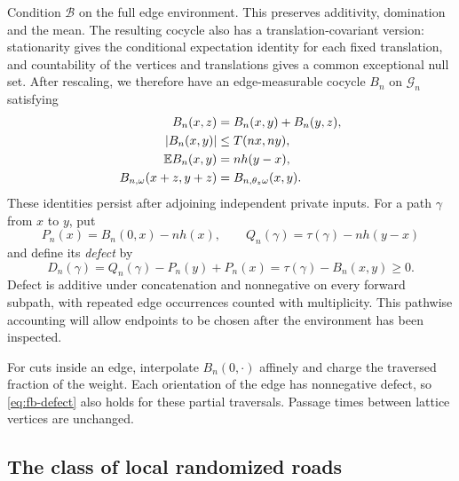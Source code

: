 Condition $\mathcal B$ on the full edge environment.  This preserves
additivity, domination and the mean.  The resulting cocycle also has a
translation-covariant version: stationarity gives the conditional
expectation identity for each fixed translation, and countability of
the vertices and translations gives a common exceptional null set.
After rescaling, we therefore have an edge-measurable cocycle $B_n$ on
$\mathcal G_n$ satisfying
\begin{equation}
 \begin{split}
 B_n(x,z)&=B_n(x,y)+B_n(y,z),\\
 |B_n(x,y)|&\le T(nx,ny),\\
 \mathbb E B_n(x,y)&=n h(y-x),\\
 B_{n,\omega}(x+z,y+z)&=B_{n,\theta_z\omega}(x,y).
 \end{split}
 \label{eq:fb-calibration}
\end{equation}
These identities persist after adjoining independent private inputs.
For a path $\gamma$ from $x$ to $y$, put
\[
 P_n(x)=B_n(0,x)-nh(x),\qquad
 Q_n(\gamma)=\tau(\gamma)-nh(y-x)
\]
and define its \emph{defect} by
\begin{equation}
 D_n(\gamma)
 =Q_n(\gamma)-P_n(y)+P_n(x)
 =\tau(\gamma)-B_n(x,y)\ge0.
 \label{eq:fb-defect}
\end{equation}
Defect is additive under concatenation and nonnegative on every
forward subpath, with repeated edge occurrences counted with
multiplicity.  This pathwise accounting will allow endpoints to be
chosen after the environment has been inspected.

For cuts inside an edge, interpolate $B_n(0,\cdot)$ affinely and charge
the traversed fraction of the weight.  Each orientation of the edge
has nonnegative defect, so \eqref{eq:fb-defect} also holds for these
partial traversals.  Passage times between lattice vertices are
unchanged.

\subsection{The class of local randomized roads}
\label{sec:fb-roads}

